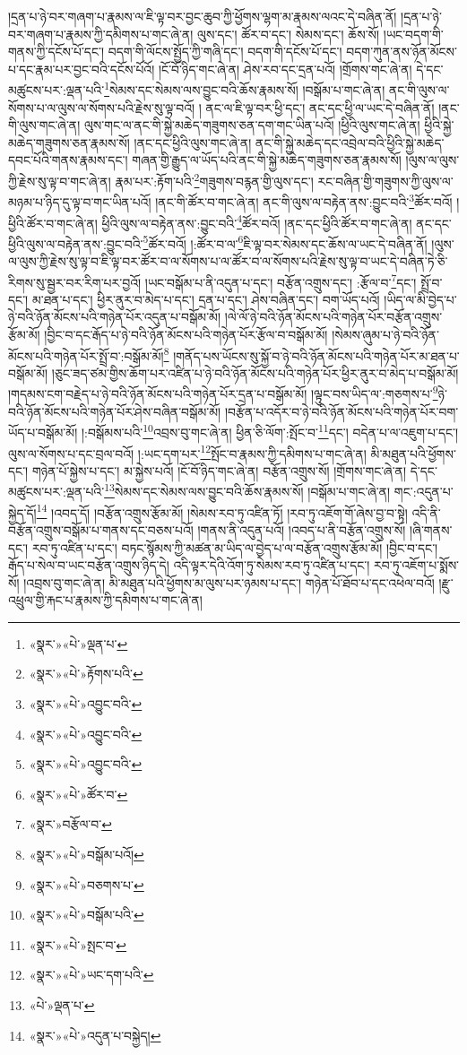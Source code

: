 །དྲན་པ་ཉེ་བར་གཞག་པ་རྣམས་ལ་ཇི་ལྟ་བར་བྱང་ཆུབ་ཀྱི་ཕྱོགས་ལྷག་མ་རྣམས་ལའང་དེ་བཞིན་ནོ། །དྲན་པ་ཉེ་བར་གཞག་པ་རྣམས་ཀྱི་དམིགས་པ་གང་ཞེ་ན། ལུས་དང་། ཚོར་བ་དང་། སེམས་དང་། ཆོས་སོ། །ཡང་བདག་གི་གནས་ཀྱི་དངོས་པོ་དང་། བདག་གི་ལོངས་སྤྱོད་ཀྱི་གཞི་དང་། བདག་གི་དངོས་པོ་དང་། བདག་ཀུན་ནས་ཉོན་མོངས་པ་དང་རྣམ་པར་བྱང་བའི་དངོས་པོའོ། །ངོ་བོ་ཉིད་གང་ཞེ་ན། ཤེས་རབ་དང་དྲན་པའོ། །གྲོགས་གང་ཞེ་ན། དེ་དང་མཚུངས་པར་:ལྡན་པའི་\footnote{«སྣར་»«པེ་»ལྡན་པ་}སེམས་དང་སེམས་ལས་བྱུང་བའི་ཆོས་རྣམས་སོ། །བསྒོམ་པ་གང་ཞེ་ན། ནང་གི་ལུས་ལ་སོགས་པ་ལ་ལུས་ལ་སོགས་པའི་རྗེས་སུ་ལྟ་བའོ། །
ནང་ལ་ཇི་ལྟ་བར་ཕྱི་དང་། ནང་དང་ཕྱི་ལ་ཡང་དེ་བཞིན་ནོ། །ནང་གི་ལུས་གང་ཞེ་ན། ལུས་གང་ལ་ནང་གི་སྐྱེ་མཆེད་གཟུགས་ཅན་དག་གང་ཡིན་པའོ། །ཕྱིའི་ལུས་གང་ཞེ་ན། ཕྱིའི་སྐྱེ་མཆེད་གཟུགས་ཅན་རྣམས་སོ། །ནང་དང་ཕྱིའི་ལུས་གང་ཞེ་ན། ནང་གི་སྐྱེ་མཆེད་དང་འབྲེལ་བའི་ཕྱིའི་སྐྱེ་མཆེད་དབང་པོའི་གནས་རྣམས་དང་། གཞན་གྱི་རྒྱུད་ལ་ཡོད་པའི་ནང་གི་སྐྱེ་མཆེད་གཟུགས་ཅན་རྣམས་སོ། །ལུས་ལ་ལུས་ཀྱི་རྗེས་སུ་ལྟ་བ་གང་ཞེ་ན། རྣམ་པར་:རྟོག་པའི་\footnote{«སྣར་»«པེ་»རྟོགས་པའི་}གཟུགས་བརྙན་གྱི་ལུས་དང་། རང་བཞིན་གྱི་གཟུགས་ཀྱི་ལུས་ལ་མཉམ་པ་ཉིད་དུ་ལྟ་བ་གང་ཡིན་པའོ། །ནང་གི་ཚོར་བ་གང་ཞེ་ན། ནང་གི་ལུས་ལ་བརྟེན་ནས་:བྱུང་བའི་\footnote{«སྣར་»«པེ་»འབྱུང་བའི་}ཚོར་བའོ། །ཕྱིའི་ཚོར་བ་གང་ཞེ་ན། ཕྱིའི་ལུས་ལ་བརྟེན་ནས་:བྱུང་བའི་\footnote{«སྣར་»«པེ་»འབྱུང་བའི་}ཚོར་བའོ། །ནང་དང་ཕྱིའི་ཚོར་བ་གང་ཞེ་ན། ནང་དང་ཕྱིའི་ལུས་ལ་བརྟེན་ནས་:བྱུང་བའི་\footnote{«སྣར་»«པེ་»འབྱུང་བའི་}ཚོར་བའོ། །:ཚོར་བ་ལ་\footnote{«སྣར་»«པེ་»ཚོར་བ་}ཇི་ལྟ་བར་སེམས་དང་ཆོས་ལ་ཡང་དེ་བཞིན་ནོ། །ལུས་ལ་ལུས་ཀྱི་རྗེས་སུ་ལྟ་བ་ཇི་ལྟ་བར་ཚོར་བ་ལ་སོགས་པ་ལ་ཚོར་བ་ལ་སོགས་པའི་རྗེས་སུ་ལྟ་བ་ཡང་དེ་བཞིན་ཏེ་ཅི་རིགས་སུ་སྦྱར་བར་རིག་པར་བྱའོ། །ཡང་བསྒོམ་པ་ནི་འདུན་པ་དང་། བརྩོན་འགྲུས་དང་། :རྩོལ་བ་\footnote{«སྣར་»བརྩོལ་བ་}དང་། སྤྲོ་བ་དང་། མ་ཐན་པ་དང་། ཕྱིར་ནུར་བ་མེད་པ་དང་། དྲན་པ་དང་། ཤེས་བཞིན་དང་། བག་ཡོད་པའོ། །ཡིད་ལ་མི་བྱེད་པ་ཉེ་བའི་ཉོན་མོངས་པའི་གཉེན་པོར་འདུན་པ་བསྒོམ་མོ། །ལེ་ལོ་ཉེ་བའི་ཉོན་མོངས་པའི་གཉེན་པོར་བརྩོན་འགྲུས་རྩོམ་མོ། །བྱིང་བ་དང་རྒོད་པ་ཉེ་བའི་ཉོན་མོངས་པའི་གཉེན་པོར་རྩོལ་བ་བསྒོམ་མོ། །སེམས་ཞུམ་པ་ཉེ་བའི་ཉོན་མོངས་པའི་གཉེན་པོར་སྤྲོ་བ་:བསྒོམ་མོ།\footnote{«སྣར་»«པེ་»བསྒོམ་པའོ།} །གནོད་པས་ཡོངས་སུ་སྐྱོ་བ་ཉེ་བའི་ཉོན་མོངས་པའི་གཉེན་པོར་མ་ཐན་པ་བསྒོམ་མོ། །ཅུང་ཟད་ཙམ་གྱིས་ཆོག་པར་འཛིན་པ་ཉེ་བའི་ཉོན་མོངས་པའི་གཉེན་པོར་ཕྱིར་ནུར་བ་མེད་པ་བསྒོམ་མོ། །གདམས་ངག་བརྗེད་པ་ཉེ་བའི་ཉོན་མོངས་པའི་གཉེན་པོར་དྲན་པ་བསྒོམ་མོ། །ལྟུང་བས་ཡིད་ལ་:གཅགས་པ་\footnote{«སྣར་»«པེ་»བཅགས་པ་}ཉེ་བའི་ཉོན་མོངས་པའི་གཉེན་པོར་ཤེས་བཞིན་བསྒོམ་མོ། །བརྩོན་པ་འདོར་བ་ཉེ་བའི་ཉོན་མོངས་པའི་གཉེན་པོར་བག་ཡོད་པ་བསྒོམ་མོ། །:བསྒོམས་པའི་\footnote{«སྣར་»«པེ་»བསྒོམ་པའི་}འབྲས་བུ་གང་ཞེ་ན། ཕྱིན་ཅི་ལོག་:སྤོང་བ་\footnote{«སྣར་»«པེ་»སྤང་བ་}དང་། བདེན་པ་ལ་འཇུག་པ་དང་། ལུས་ལ་སོགས་པ་དང་བྲལ་བའོ། །:ཡང་དག་པར་\footnote{«སྣར་»«པེ་»ཡང་དག་པའི་}སྤོང་བ་རྣམས་ཀྱི་དམིགས་པ་གང་ཞེ་ན། མི་མཐུན་པའི་ཕྱོགས་དང་། གཉེན་པོ་སྐྱེས་པ་དང་། མ་སྐྱེས་པའོ། །ངོ་བོ་ཉིད་གང་ཞེ་ན། བརྩོན་འགྲུས་སོ། །གྲོགས་གང་ཞེ་ན། དེ་དང་མཚུངས་པར་:ལྡན་པའི་\footnote{«པེ་»ལྡན་པ་}སེམས་དང་སེམས་ལས་བྱུང་བའི་ཆོས་རྣམས་སོ། །བསྒོམ་པ་གང་ཞེ་ན། གང་:འདུན་པ་སྐྱེད་དོ།\footnote{«སྣར་»«པེ་»འདུན་པ་བསྐྱེད།} །འབད་དོ། །བརྩོན་འགྲུས་རྩོམ་མོ། །སེམས་རབ་ཏུ་འཛིན་ཏོ། །རབ་ཏུ་འཇོག་གོ་ཞེས་བྱ་བ་སྟེ། འདི་ནི་བརྩོན་འགྲུས་བསྒོམ་པ་གནས་དང་བཅས་པའོ། །གནས་ནི་འདུན་པའོ། །འབད་པ་ནི་བརྩོན་འགྲུས་སོ། །ཞི་གནས་དང་། རབ་ཏུ་འཛིན་པ་དང་། བཏང་སྙོམས་ཀྱི་མཚན་མ་ཡིད་ལ་བྱེད་པ་ལ་བརྩོན་འགྲུས་རྩོམ་མོ། །བྱིང་བ་དང་། རྒོད་པ་སེལ་བ་ཡང་བརྩོན་འགྲུས་ཉིད་དེ། འདི་ལྟར་དེའི་འོག་ཏུ་སེམས་རབ་ཏུ་འཛིན་པ་དང་། རབ་ཏུ་འཇོག་པ་སྨོས་སོ། །འབྲས་བུ་གང་ཞེ་ན། མི་མཐུན་པའི་ཕྱོགས་མ་ལུས་པར་ཉམས་པ་དང་། གཉེན་པོ་ཐོབ་པ་དང་འཕེལ་བའོ། །རྫུ་འཕྲུལ་གྱི་རྐང་པ་རྣམས་ཀྱི་དམིགས་པ་གང་ཞེ་ན། 